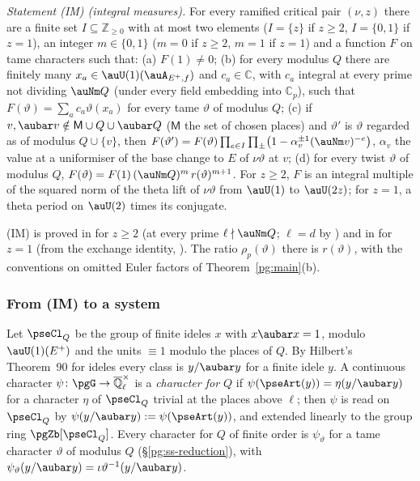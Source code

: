 \documentclass[10pt]{amsart}
\theoremstyle{definition}
\theoremstyle{remark}
\newcommand{\C}{\mathbb C}
\newcommand{\Z}{\mathbb Z}
\newcommand{\Q}{\mathbb Q}
\begin{document}
\noindent\emph{Statement (IM) (integral measures).} For every ramified critical pair $(\nu,z)$ there
are a finite set $I\subseteq\Z_{\ge0}$ with at most two elements ($I=\{z\}$ if $z\ge2$, $I=\{0,1\}$ if
$z=1$), an integer $m\in\{0,1\}$ ($m=0$ if $z\ge2$, $m=1$ if $z=1$) and a function $F$ on tame
characters such that: (a) $F(1)\ne0$; (b) for every modulus $Q$ there are finitely many
$x_a\in\auU(1)(\auA_{E^+,f})$ and $c_a\in\C$, with $c_a$ integral at every prime not dividing
$\auNm Q$ (under every field embedding into $\C_p$), such that $F(\vartheta)=\sum_ac_a\vartheta(x_a)$
for every tame $\vartheta$ of modulus $Q$; (c) if $v,\aubar v\notin\mathsf M\cup Q\cup\aubar Q$ ($\mathsf M$ the set of chosen places) and
$\vartheta'$ is $\vartheta$ regarded as of modulus $Q\cup\{v\}$, then $F(\vartheta')=F(\vartheta)
\prod_{e\in I}\prod_\pm\bigl(1-\alpha_v^{\pm1}(\auNm v)^{-e}\bigr)$, $\alpha_v$ the value at a
uniformiser of the base change to $E$ of $\nu\vartheta$ at $v$; (d) for every twist $\vartheta$ of
modulus $Q$, $F(\vartheta)=F(1)\,(\auNm Q)^m\,r(\vartheta)^{m+1}$. For $z\ge2$, $F$ is an integral
multiple of the squared norm of the theta lift of $\nu\vartheta$ from $\auU(1)$ to $\auU(2z)$; for
$z=1$, a theta period on $\auU(2)$ times its conjugate.

\smallskip\noindent (IM) is proved in {\cite[Proposition~3.8]{P54}} for $z\ge2$ (at every prime $\ell\nmid
\auNm Q$; $\ell=d$ by {\cite[Lemma~3.6]{P54}}) and in {\cite[Proposition~3.12]{P54}} for $z=1$ (from the
exchange identity, {\cite[Theorem~3.2]{P53}}). The ratio $\rho_p(\vartheta)$ there is $r(\vartheta)$, with
the conventions on omitted Euler factors of Theorem~\ref{pg:main}(b).\par\smallskip

\subsubsection*{From (IM) to a system}
Let $\pseCl_Q$ be the group of finite ideles $x$ with $x\aubar x=1$, modulo $\auU(1)(E^+)$ and the
units $\equiv1$ modulo the places of $Q$. By Hilbert's Theorem~90 for ideles every class is
$y/\aubar y$ for a finite idele $y$. A continuous character $\psi\colon\pgG\to\overline{\Q}_\ell^\times$
is a \emph{character for $Q$} if $\psi(\pseArt(y))=\eta(y/\aubar y)$ for a character $\eta$ of
$\pseCl_Q$ trivial at the places above $\ell$; then $\psi$ is read on $\pseCl_Q$ by
$\psi(y/\aubar y):=\psi(\pseArt(y))$, and extended linearly to the group ring $\pgZb[\pseCl_Q]$. Every
character for $Q$ of finite order is $\psi_\vartheta$ for a tame character $\vartheta$ of modulus $Q$
(\S\ref{pg:ss-reduction}), with $\psi_\vartheta(y/\aubar y)=
\iota\vartheta^{-1}(y/\aubar y)$.
\end{document}
